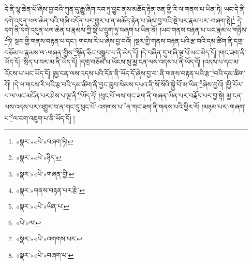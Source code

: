 དེ་ནི་ལྷ་ཆེན་པོ་ཞེས་བྱ་བའི་ཀུན་དུ་རྒྱུ་ཞིག་རབ་ཏུ་བྱུང་ནས་མཆོད་རྟེན་ཅན་གྱི་རི་ལ་གནས་པ་ཡིན་ཏེ། ཡང་དེ་ནི་དགེ་འདུན་ཕལ་ཆེན་པའི་གཞི་འདོན་པར་གྱུར་པ་ན་མཆོད་རྟེན་པ་ཞེས་བྱ་བའི་སྡེ་པར་རྣམ་པར་:བཞག་སྟེ།\footnote{«སྣར་»«པེ་»བཞག་ཏེ།} དེ་དག་ནི་དགེ་འདུན་ཕལ་ཆེན་པ་རྣམས་ཀྱི་སྡེ་པ་དྲུག་ཏུ་བཞག་པ་ཡིན་ནོ། །ཡང་གནས་བརྟན་པ་ཡང་རྣམ་པ་གཉིས་\footnote{«སྣར་»«པེ་»ཉིད་}ཏེ། སྔར་གྱི་གནས་བརྟན་པ་དང་། གངས་རི་པ་ཞེས་བྱ་བའོ། །སྔར་གྱི་གནས་བརྟན་པའི་རྩ་བའི་དམ་ཚིག་ནི་དགྲ་བཅོམ་པ་རྣམས་ལ་:གཞན་གྱིས་\footnote{«སྣར་»«པེ་»གཞན་གྱི་}སྟོན་ཅིང་བསྒྲུབ་པ་ནི་མེད་དོ། །དེ་བཞིན་དུ་གཞི་ལྔ་པོ་ཡང་མེད་དོ། །གང་ཟག་ནི་ཡོད་དོ། །སྲིད་པ་བར་མ་ནི་ཡོད་དོ། །དགྲ་བཅོམ་པ་ཡོངས་སུ་མྱ་ངན་ལས་འདས་པ་ནི་ཡོད་དོ། །འདས་པ་དང་མ་འོངས་པ་ཡང་ཡོད་དོ། །མྱ་ངན་ལས་འདས་པའི་དོན་ནི་ཡོད་དོ་ཞེས་བྱ་བ་:ནི་གནས་བརྟན་པའི་རྩ་\footnote{«སྣར་»གནས་བརྟན་པར་རྩེ་}བའི་དམ་ཚིག་གོ། །དེ་ལ་གངས་རི་པའི་རྩ་བའི་དམ་ཚིག་ནི་བྱང་ཆུབ་སེམས་དཔའ་ནི་སོ་སོའི་སྐྱེ་བོ་མ་ཡིན་\footnote{«སྣར་»«པེ་»ཡིན་པ་}ཞེས་བྱའོ། །ཕྱི་རོལ་པ་ལ་ཡང་མངོན་པར་ཤེས་པ་ལྔ་ནི་\footnote{«པེ་»ལ་}ཡོད་དོ། །ཕུང་པོ་ལས་གང་ཟག་ནི་གཞན་ཡིན་པར་བརྗོད་པར་བྱ་སྟེ། མྱ་ངན་ལས་འདས་པར་འགྱུར་བ་ན་གང་དུ་ཕུང་པོ་:འགགས་པ་\footnote{«སྣར་»«པེ་»འགགས་པར་}ན་གང་ཟག་ནི་གནས་པའི་ཕྱིར་རོ། །མཉམ་པར་:གཞག་པ་\footnote{«སྣར་»«པེ་»བཞག་པ་}ལ་ངག་འཇུག་པ་ནི་ཡོད་དོ། །
